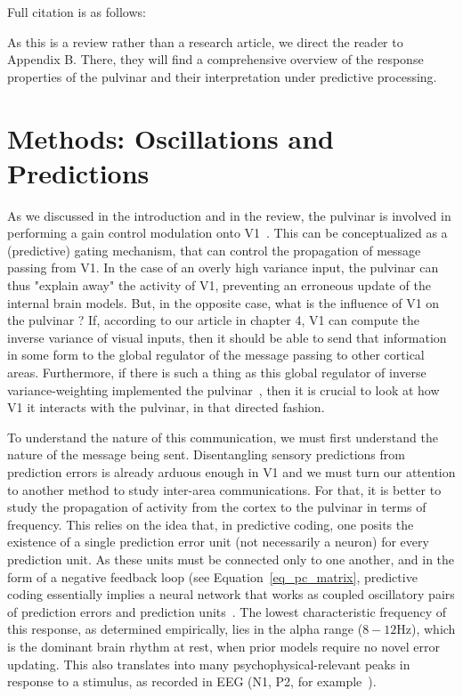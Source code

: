 Full citation is as follows: 

As this is a review rather than a research article, we direct the reader to Appendix B. There, they will find a comprehensive overview of the response properties of the pulvinar and their interpretation under predictive processing.



\section{Methods: Oscillations and Predictions}
As we discussed in the introduction and in the review, the pulvinar is involved in performing a gain control modulation onto \gls{V1}~\cite{purushothaman2012gating}. This can be conceptualized as a (predictive) gating mechanism, that can control the propagation of message passing from \gls{V1}. In the case of an overly high variance input, the pulvinar can thus "explain away" the activity of \gls{V1}, preventing an erroneous update of the internal brain models. But, in the opposite case, what is the influence of \gls{V1} on the pulvinar ? If, according to our article in chapter 4, \gls{V1} can compute the inverse variance of visual inputs, then it should be able to send that information in some form to the global regulator of the message passing to other cortical areas. Furthermore, if there is such a thing as this global regulator of inverse variance-weighting implemented the pulvinar~\cite{kanai2015cerebral}, then it is crucial to look at how \gls{V1} it interacts with the pulvinar, in that directed fashion. 

To understand the nature of this communication, we must first understand the nature of the message being sent. Disentangling sensory predictions from prediction errors is already arduous enough in \gls{V1} and we must turn our attention to another method to study inter-area communications. For that, it is better to study the propagation of activity from the cortex to the pulvinar in terms of frequency. This relies on the idea that, in predictive coding, one posits the existence of a single prediction error unit (not necessarily a neuron) for every prediction unit. As these units must be connected only to one another, and in the form of a negative feedback loop (see Equation~\ref{eq_pc_matrix}, predictive coding essentially implies a neural network that works as coupled oscillatory pairs of prediction errors and prediction units~\cite{friston2019waves}. The lowest characteristic frequency of this response, as determined empirically, lies in the alpha range ($8-12 \text{Hz}$), which is the dominant brain rhythm at rest, when prior models require no novel error updating. This also translates into many psychophysical-relevant peaks in response to a stimulus, as recorded in EEG (N1, P2, for example~\cite{bruyns2017neurogenesis}). 

